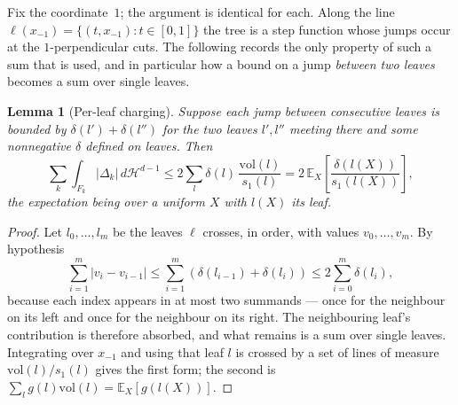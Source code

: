 \documentclass[12pt,a4paper]{article}
\numberwithin{equation}{section}
\theoremstyle{plain}
\newtheorem{lemma}{Lemma}
\theoremstyle{definition}
\newcommand{\E}{\mathbb{E}}
\newcommand{\abs}[1]{\left| #1 \right|}
\begin{document}
	Fix the coordinate~$1$; the argument is identical for each. Along the line
	$\ell(x_{-1}) = \{(t, x_{-1}) : t \in [0,1]\}$ the tree is a step function
	whose jumps occur at the $1$-perpendicular cuts. The following records the
	only property of such a sum that is used, and in particular how a bound on a
	jump \emph{between two leaves} becomes a sum over single leaves.

	\begin{lemma}[Per-leaf charging]
		\label{lem:charging}
		Suppose each jump between consecutive leaves is bounded by
		$\delta(l') + \delta(l'')$ for the two leaves $l', l''$ meeting there and
		some nonnegative $\delta$ defined on leaves. Then
		\begin{equation}
			\sum_k \int_{F_k} \abs{\Delta_k}\, d\mathcal{H}^{d-1}
			\leq 2\sum_l \delta(l)\,\frac{\mathrm{vol}(l)}{s_1(l)}
			= 2\,\E_X\!\left[\frac{\delta(l(X))}{s_1(l(X))}\right],
			\label{eq:sections}
		\end{equation}
		the expectation being over a uniform $X$ with $l(X)$ its leaf.
	\end{lemma}

	\begin{proof}
		Let $l_0, \dots, l_{m}$ be the leaves $\ell$ crosses, in order, with
		values $v_0, \dots, v_m$. By hypothesis
		\begin{equation}
			\sum_{i=1}^{m} \abs{v_i - v_{i-1}}
			\leq \sum_{i=1}^{m}\left(\delta(l_{i-1}) + \delta(l_i)\right)
			\leq 2\sum_{i=0}^{m} \delta(l_i),
		\end{equation}
		because each index appears in at most two summands --- once for the
		neighbour on its left and once for the neighbour on its right. The
		neighbouring leaf's contribution is therefore absorbed, and what remains
		is a sum over single leaves. Integrating over $x_{-1}$ and using that
		leaf $l$ is crossed by a set of lines of measure
		$\mathrm{vol}(l)/s_1(l)$ gives the first form; the second is
		$\sum_l g(l)\mathrm{vol}(l) = \E_X[g(l(X))]$.
	\end{proof}
\end{document}
